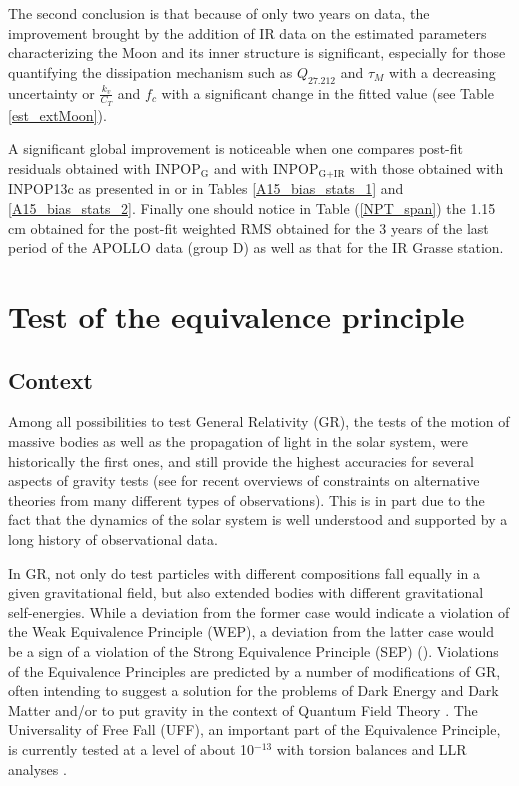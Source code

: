 \documentclass[fleqn,usenatbib,referee]{mnras}
\begin{document}
  The second conclusion is that because of only two years on data, the improvement brought by the addition of IR data on the estimated parameters characterizing the Moon and its inner structure is significant, especially for those quantifying the dissipation mechanism such as $Q_{27.212}$ and $\tau_{M}$ with a decreasing uncertainty or $\frac{k_{v}}{C_{T}}$ and $f_c$ with a significant change in the fitted value (see Table \ref{est_extMoon}).

A significant global improvement is  noticeable when one compares post-fit residuals obtained with INPOP$_{\textrm{G}}$ and with INPOP$_{\textrm{G+IR}}$ with those obtained with INPOP13c as presented in \textbf{\cite{inpop13c}} or in Tables \ref{A15_bias_stats_1} and \ref{A15_bias_stats_2}.
  Finally one should notice in Table (\ref{NPT_span}) the 1.15 cm obtained for the post-fit weighted RMS obtained for the 3 years of the last period of the APOLLO data (group D) as well as that for the IR Grasse station. 

\section{Test of the equivalence principle}
\label{fundphy}
\subsection{Context}
Among all possibilities to test General Relativity (GR), the tests of the motion of massive bodies as well as the propagation of light in the solar system, were historically the first ones, and still provide the highest accuracies for several aspects of gravity tests (see \cite{joyce2015,berti2015,Yunes2016} for recent overviews of constraints on alternative theories from many different types of observations). This is in part due to the fact that the dynamics of the solar system is well understood and supported by a long history of observational data.  

In GR, not only do test particles with different compositions fall equally in a given gravitational field, but also extended bodies with different gravitational self-energies. While a deviation from the former case would indicate a violation of the Weak Equivalence Principle (WEP), a deviation from the latter case would be a sign of a violation of the Strong Equivalence Principle (SEP) (\cite{will:2014lr}). Violations of the Equivalence Principles are predicted by a number of modifications of GR, often intending to suggest a solution for the problems of Dark Energy and Dark Matter \cite{capozziello2011, joyce2015,berti2015} and/or to put gravity in the context of Quantum Field Theory \cite{kostelecky2004,woodard2009,donoghue2017}. The Universality of Free Fall (UFF), an important part of the Equivalence Principle, is currently tested at a level of about 10$^{-13}$ with torsion balances \cite[]{2003PhRvD..68f2002A} and LLR analyses \cite[]{Williams2012}. 
\end{document}

